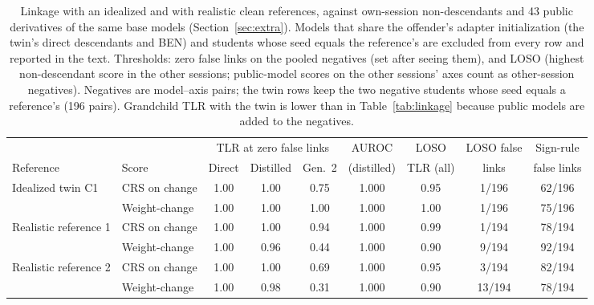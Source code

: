 \begin{table}[t]\centering\caption{Linkage with an idealized and with realistic clean references, against own-session non-descendants and 43 public derivatives of the same base models (Section~\ref{sec:extra}). Models that share the offender's adapter initialization (the twin's direct descendants and BEN) and students whose seed equals the reference's are excluded from every row and reported in the text. Thresholds: zero false links on the pooled negatives (set after seeing them), and LOSO (highest non-descendant score in the other sessions; public-model scores on the other sessions' axes count as other-session negatives). Negatives are model--axis pairs; the twin rows keep the two negative students whose seed equals a reference's (196 pairs). Grandchild TLR with the twin is lower than in Table~\ref{tab:linkage} because public models are added to the negatives.}\label{tab:realistic}
\begin{tabular}{llccccccc}\toprule
 & & \multicolumn{3}{c}{TLR at zero false links} & AUROC & LOSO & LOSO false & Sign-rule \\\cmidrule(lr){3-5}
Reference & Score & Direct & Distilled & Gen.~2 & (distilled) & TLR (all) & links & false links \\\midrule
Idealized twin C1 & CRS on change & 1.00 & 1.00 & 0.75 & 1.000 & 0.95 & 1/196 & 62/196 \\
 & Weight-change & 1.00 & 1.00 & 1.00 & 1.000 & 1.00 & 1/196 & 75/196 \\
Realistic reference 1 & CRS on change & 1.00 & 1.00 & 0.94 & 1.000 & 0.99 & 1/194 & 78/194 \\
 & Weight-change & 1.00 & 0.96 & 0.44 & 1.000 & 0.90 & 9/194 & 92/194 \\
Realistic reference 2 & CRS on change & 1.00 & 1.00 & 0.69 & 1.000 & 0.95 & 3/194 & 82/194 \\
 & Weight-change & 1.00 & 0.98 & 0.31 & 1.000 & 0.90 & 13/194 & 78/194 \\
\bottomrule\end{tabular}\end{table}
